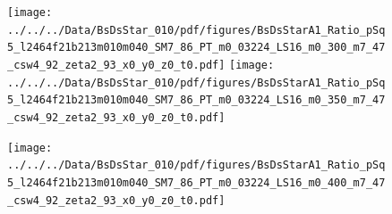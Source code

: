 \documentclass[a4paper,10pt]{article}
\begin{document}
\clearpage
\begin{figure}[p]
 \texttt{[image: ../../../Data/BsDsStar\_010/pdf/figures/BsDsStarA1\_Ratio\_pSq5\_l2464f21b213m010m040\_SM7\_86\_PT\_m0\_03224\_LS16\_m0\_300\_m7\_47\_csw4\_92\_zeta2\_93\_x0\_y0\_z0\_t0.pdf]} 
 \texttt{[image: ../../../Data/BsDsStar\_010/pdf/figures/BsDsStarA1\_Ratio\_pSq5\_l2464f21b213m010m040\_SM7\_86\_PT\_m0\_03224\_LS16\_m0\_350\_m7\_47\_csw4\_92\_zeta2\_93\_x0\_y0\_z0\_t0.pdf]} 
 \end{figure}
\begin{figure}[p]
 \texttt{[image: ../../../Data/BsDsStar\_010/pdf/figures/BsDsStarA1\_Ratio\_pSq5\_l2464f21b213m010m040\_SM7\_86\_PT\_m0\_03224\_LS16\_m0\_400\_m7\_47\_csw4\_92\_zeta2\_93\_x0\_y0\_z0\_t0.pdf]} 
 \end{figure}
\clearpage
\end{document}
